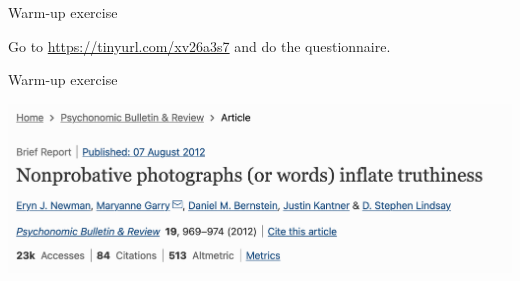 \documentclass[aspectratio=169]{beamer}
\begin{document}
\begin{frame}{Warm-up exercise}

Go to \url{https://tinyurl.com/xv26a3s7} and do the questionnaire.

\end{frame}
\begin{frame}{Warm-up exercise}

\begin{center}
\includegraphics[width=\textwidth]{figures/newman2012-abstract.png}
\end{center}

\vfill
{}

\end{frame}
\end{document}
